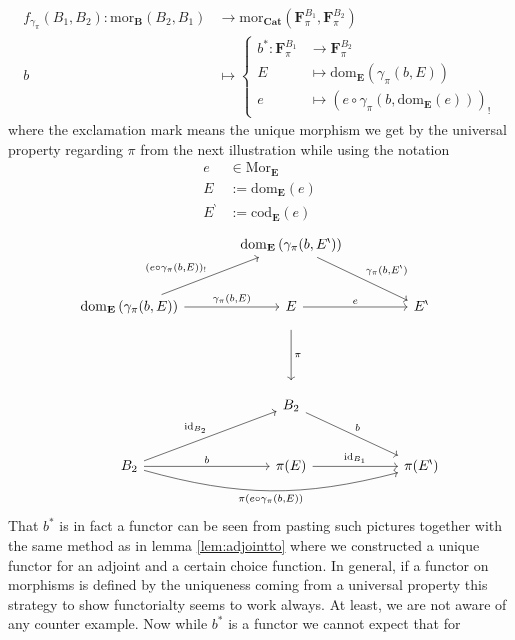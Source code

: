 \begin{align*}
  f_{\gamma_{\pi}}(B_{1},B_{2})
  \colon
  \mathrm{mor}_{\mathbf{B}}(B_{2},B_{1})
  &\rightarrow
  \mathrm{mor}_{\mathbf{Cat}}
  \left(
    \mathbf{F}_{\pi}^{B_{1}},
    \mathbf{F}_{\pi}^{B_{2}}
  \right)
  \\
  b
  &\mapsto
  \left\lbrace
  \begin{aligned}
    b^{\ast}
    \colon
    \mathbf{F}_{\pi}^{B_{1}}
    &\rightarrow
    \mathbf{F}_{\pi}^{B_{2}}
    \\
    E
    &\mapsto
    \mathrm{dom}_{\mathbf{E}}
    \left(
      \gamma_{\pi}(b,E)
    \right)
    \\
    e
    &\mapsto
    \left(
      e
      \circ
      \gamma_{\pi}(b,\mathrm{dom}_{\mathbf{E}}(e))
    \right)_{!}
  \end{aligned}
  \right.
\end{align*}
where the exclamation mark means the unique morphism we get by the universal property regarding $\pi$ from the next illustration while using the notation
\begin{align*}
  e
  &\in
  \mathrm{Mor}_{\mathbf{E}}
  \\
  E
  &:=
  \mathrm{dom}_{\mathbf{E}}(e)
  \\
  E^{\backprime}
  &:=
  \mathrm{cod}_{\mathbf{E}}(e)
\end{align*}
\[
\begin{tikzcd}[sep=large]
  &
  \mathrm{dom}_{\mathbf{E}}
  \left(
    \gamma_{\pi}(b,E^{\backprime})
  \right)
  \arrow{dr}{\gamma_{\pi}(b,E^{\backprime})}
  &
  \\
  \mathrm{dom}_{\mathbf{E}}
  \left(
    \gamma_{\pi}(b,E)
  \right)
  \arrow{ur}{(e \circ \gamma_{\pi}(b,E))_{!}}
  \arrow{r}{\gamma_{\pi}(b,E)}
  &
  E
  \arrow{r}{e}
  \arrow[shorten <= 10pt, shorten >= 10pt]{dd}{\pi}
  &
  E^{\backprime}
  \\
  &
  &
  \\
  &
  B_{2}
  \arrow{dr}{b}
  &
  \\
  B_{2}
  \arrow{ur}{\mathrm{id}_{B_{2}}}
  \arrow{r}{b}
  \arrow[swap,bend right=15]{rr}{\pi(e \circ \gamma_{\pi}(b,E))}
  &
  \pi(E)
  \arrow{r}{\mathrm{id}_{B_{1}}}
  &
  \pi(E^{\backprime})
\end{tikzcd}
\]
That $b^{\ast}$ is in fact a functor can be seen from pasting such pictures together with the same method as in lemma \ref{lem:adjointto} where we constructed a unique functor for an adjoint and a certain choice function. In general, if a functor on morphisms is defined by the uniqueness coming from a universal property this strategy to show functorialty seems to work always. At least, we are not aware of any counter example. Now while $b^{\ast}$ is a functor we cannot expect that for
